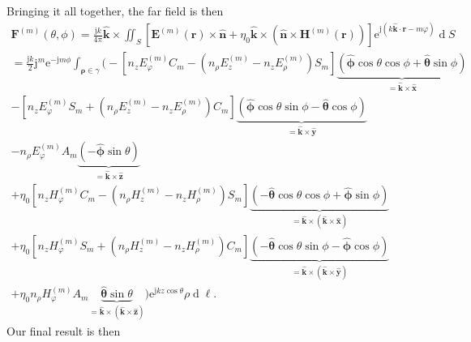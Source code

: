 \documentclass[a4paper,12pt]{article}
\renewcommand{\vec}[1]{\boldsymbol{#1}}
\newcommand{\unitvec}[1]{\hat{\vec{#1}}}
\newcommand{\mrm}[1]{\mathrm{#1}}
\newcommand{\diff}{\operatorname{d}\!}
\newcommand{\ju}{\mrm{j}}
\newcommand{\eu}{\mrm{e}}
\newcommand{\Ev}{\vec{E}}
\newcommand{\Hv}{\vec{H}}
\newcommand{\Fv}{\vec{F}}
\newcommand{\rv}{\vec{r}}
\newcommand{\xuv}{\unitvec{x}}
\newcommand{\yuv}{\unitvec{y}}
\newcommand{\zuv}{\unitvec{z}}
\newcommand{\nuv}{\unitvec{n}}
\newcommand{\kuv}{\unitvec{k}}
\newcommand{\thetauv}{\unitvec{\theta}}
\newcommand{\phiuv}{\unitvec{\phi}}
\begin{document}
Bringing it all together, the far field is then 
\begin{multline}
  \Fv^{(m)}(\theta,\phi) = \frac{\ju k}{4\pi} \kuv\times \iint_{S} \left[ \Ev^{(m)}(\rv)\times\nuv + \eta_{0}\kuv\times(\nuv\times\Hv^{(m)}(\rv)) \right] \eu^{\ju(k\kuv\cdot\rv-m\varphi)} \diff S \\
  = \frac{\ju k}{2} \ju^{m}\eu^{-\ju m\phi} \int_{\vec{\rho}\in\gamma}
  \Big( - \left[ n_{z}E_{\varphi}^{(m)}C_{m}
    - (n_{\rho}E_{z}^{(m)} - n_{z}E_{\rho}^{(m)})S_{m} \right] \underbrace{(\phiuv\cos\theta\cos\phi + \thetauv\sin\phi)}_{=\kuv\times\xuv} \\
  - \left[ n_{z}E_{\varphi}^{(m)}S_{m}
    + (n_{\rho}E_{z}^{(m)} - n_{z}E_{\rho}^{(m)}) C_{m} \right] \underbrace{(\phiuv\cos\theta\sin\phi - \thetauv\cos\phi)}_{=\kuv\times\yuv} \\
  - n_{\rho}E_{\varphi}^{(m)}A_{m} \underbrace{(-\phiuv\sin\theta)}_{=\kuv\times\zuv} \\
  + \eta_{0} \left[ n_{z}H_{\varphi}^{(m)}C_{m}
    - (n_{\rho}H_{z}^{(m)} - n_{z}H_{\rho}^{(m)})S_{m} \right] \underbrace{(-\thetauv\cos\theta\cos\phi + \phiuv\sin\phi)}_{=\kuv\times(\kuv\times\xuv)} \\
  + \eta_{0}\left[n_{z}H_{\varphi}^{(m)}S_{m}
    + (n_{\rho}H_{z}^{(m)} - n_{z}H_{\rho}^{(m)})C_{m} \right] \underbrace{(-\thetauv\cos\theta\sin\phi - \phiuv\cos\phi)}_{=\kuv\times(\kuv\times\yuv)} \\
  + \eta_{0} n_{\rho}H_{\varphi}^{(m)}A_{m}
  \underbrace{\thetauv\sin\theta}_{=\kuv\times(\kuv\times\zuv)} \Big)
  \eu^{\ju kz\cos\theta} \rho\diff\ell.
\end{multline}
Our final result is then
\end{document}
